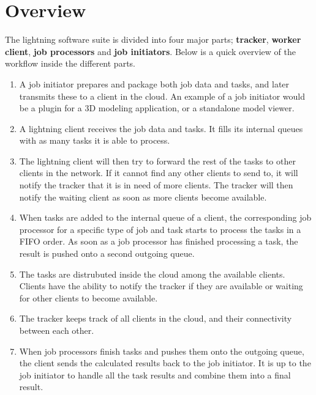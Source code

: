 \chapter{Overview}
The lightning software suite is divided into four major parts; \textbf{tracker}, \textbf{worker client}, \textbf{job processors} and \textbf{job initiators}. Below is a quick overview of the workflow inside the different parts. 

\begin{enumerate}
  \item A job initiator prepares and package both job data and tasks, and later transmits these to a client in the cloud. An example of a job initiator would be a plugin for a 3D modeling application, or a standalone model viewer.
  \item A lightning client receives the job data and tasks. It fills its internal queues with as many tasks it is able to process.
  \item The lightning client will then try to forward the rest of the tasks to other clients in the network. If it cannot find any other clients to send to, it will notify the tracker that it is in need of more clients. The tracker will then notify the waiting client as soon as more clients become available.
  \item When tasks are added to the internal queue of a client, the corresponding job processor for a specific type of job and task  starts to process the tasks in a FIFO order. As soon as a job processor has finished processing a task, the result is pushed onto a second outgoing queue.
  \item The tasks are distrubuted inside the cloud among the available clients. Clients have the ability to notify the tracker if they are available or waiting for other clients to become available.
  \item The tracker keeps track of all clients in the cloud, and their connectivity between each other.
  \item When job processors finish tasks and pushes them onto the outgoing queue, the client sends the calculated results back to the job initiator. It is up to the job initiator to handle all the task results and combine them into a final result.
\end{enumerate}

